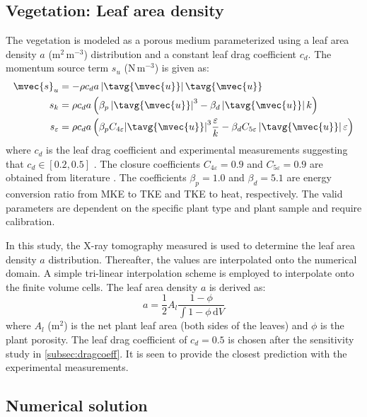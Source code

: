 \subsection{Vegetation: Leaf area density}

The vegetation is modeled as a porous medium parameterized using a leaf area density $a$ (m$^2$\,m$^{-3}$) distribution and a constant leaf drag coefficient $c_d$. The momentum source term $s_u$ (N\,m$^{-3}$) is given as:
	\begin{align}
		\mvec{s}_u &=  - \rho {c_d}a\left| \tavg{\mvec{u}} \right|\tavg{\mvec{u}} 	\label{eq:source_veg1}	 \\
		s_k &= \rho {c_d}a\left( \beta _p \left| \tavg{\mvec{u}} \right|^3 - \beta _d\left| \tavg{\mvec{u}} \right|k \right) \label{eq:source_veg2} \\
		s_\varepsilon &= \rho {c_d}a\left( {{\beta _p}{C_{4\varepsilon }}{{\left| \tavg{\mvec{u}} \right|}^3}\frac{\varepsilon }{k} - {\beta _d}{C_{5\varepsilon }}\left| \tavg{\mvec{u}} \right|\varepsilon } \right)
		\label{eq:source_veg3}
	\end{align}
where $c_d$ is the leaf drag coefficient \citep{Wilson1977} and experimental measurements suggesting that $c_d \in \left[0.2, 0.5\right]$ \citep{Vogel1989}. The closure coefficients $C_{4\varepsilon}=0.9$ and $C_{5\varepsilon}=0.9$ are obtained from literature \citep{Katul2004, Kenjeres2013, Sanz2003}. The coefficients $\beta_p=1.0$ and $\beta_d=5.1$ are energy conversion ratio from MKE to TKE and TKE to heat, respectively. The valid parameters are dependent on the specific plant type and plant sample and require calibration. 

In this study, the X-ray tomography measured is used to determine the leaf area density $a$ distribution. Thereafter, the values are interpolated onto the numerical domain. A simple tri-linear interpolation scheme is employed to interpolate onto the finite volume cells. The leaf area density $a$ is derived as: 
	\begin{equation}
	a = \frac{1}{2} A_l \frac{1 - \phi}{\int {1 - \phi }\,\mathrm{d}V}
	\label{eq:leafdensitywteq}
	\end{equation}
where $A_l$ (m$^{2}$) is the net plant leaf area (both sides of the leaves) and $\phi$ is the plant porosity. The leaf drag coefficient of $c_d = 0.5$ is chosen after the sensitivity study in \cref{subsec:dragcoeff}. It is seen to provide the closest prediction with the experimental measurements.

\subsection{Numerical solution}

